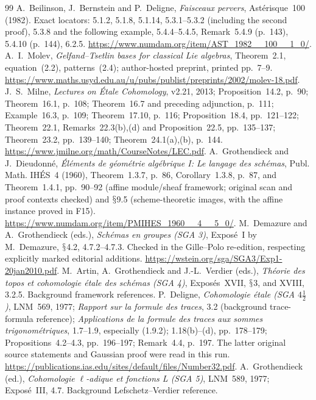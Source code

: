 \documentclass[11pt,a4paper]{article}
\renewcommand{\S}{\ensuremath{\mathsection}}
\theoremstyle{named}\newtheorem{finding}{Finding}[section]
\theoremstyle{definition}\newtheorem{definition}[finding]{Definition}
\theoremstyle{remark}\newtheorem{remark}[finding]{Remark}
\begin{document}
\begin{thebibliography}{99}
 A.~Beilinson, J.~Bernstein and P.~Deligne, \emph{Faisceaux pervers}, Ast\'erisque~100 (1982). Exact locators: 5.1.2, 5.1.8, 5.1.14, 5.3.1--5.3.2 (including the second proof), 5.3.8 and the following example, 5.4.4--5.4.5, Remark~5.4.9 (p.~143), 5.4.10 (p.~144), 6.2.5. \url{https://www.numdam.org/item/AST_1982__100__1_0/}.
 A.~I.~Molev, \emph{Gelfand--Tsetlin bases for classical Lie algebras}, Theorem~2.1, equation~(2.2), patterns~(2.4); author-hosted preprint, printed pp.~7--9. \url{https://www.maths.usyd.edu.au/u/pubs/publist/preprints/2002/molev-18.pdf}.
 J.~S.~Milne, \emph{Lectures on \'Etale Cohomology}, v2.21, 2013; Proposition~14.2, p.~90; Theorem~16.1, p.~108; Theorem~16.7 and preceding adjunction, p.~111; Example~16.3, p.~109; Theorem~17.10, p.~116; Proposition~18.4, pp.~121--122; Theorem~22.1, Remarks~22.3(b),(d) and Proposition~22.5, pp.~135--137; Theorem~23.2, pp.~139--140; Theorem~24.1(a),(b), p.~144. \url{https://www.jmilne.org/math/CourseNotes/LEC.pdf}.
 A.~Grothendieck and J.~Dieudonn\'e, \emph{\'El\'ements de g\'eom\'etrie alg\'ebrique I: Le langage des sch\'emas}, Publ. Math. IH\'ES~4 (1960), Theorem~1.3.7, p.~86, Corollary~1.3.8, p.~87, and Theorem~1.4.1, pp.~90--92 (affine module/sheaf framework; original scan and proof contexts checked) and \S9.5 (scheme-theoretic images, with the affine instance proved in F15). \url{https://www.numdam.org/item/PMIHES_1960__4__5_0/}.
 M.~Demazure and A.~Grothendieck (eds.), \emph{Sch\'emas en groupes (SGA 3)}, Expos\'e~I by M.~Demazure, \S4.2, 4.7.2--4.7.3. Checked in the Gille--Polo re-edition, respecting explicitly marked editorial additions. \url{https://wstein.org/sga/SGA3/Exp1-20jan2010.pdf}.
 M.~Artin, A.~Grothendieck and J.-L.~Verdier (eds.), \emph{Th\'eorie des topos et cohomologie \'etale des sch\'emas (SGA 4)}, Expos\'es~XVII, \S3, and XVIII, 3.2.5. Background framework references.
 P.~Deligne, \emph{Cohomologie \'etale (SGA $4\frac12$)}, LNM~569, 1977; \emph{Rapport sur la formule des traces}, 3.2 (background trace-formula reference); \emph{Applications de la formule des traces aux sommes trigonom\'etriques}, 1.7--1.9, especially (1.9.2); 1.18(b)--(d), pp.~178--179; Propositions~4.2--4.3, pp.~196--197; Remark~4.4, p.~197. The latter original source statements and Gaussian proof were read in this run. \url{https://publications.ias.edu/sites/default/files/Number32.pdf}.
 A.~Grothendieck (ed.), \emph{Cohomologie \(\ell\)-adique et fonctions L (SGA 5)}, LNM~589, 1977; Expos\'e~III, 4.7. Background Lefschetz--Verdier reference.

\end{thebibliography}
\end{document}
